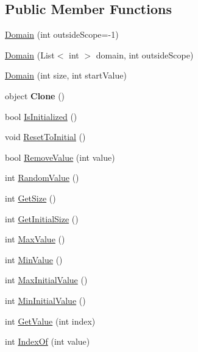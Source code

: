 \subsection*{Public Member Functions}
\begin{DoxyCompactItemize}
\item 
\hyperlink{classghost_1_1Domain_a62af4592a700051d017678189d1f9d2a}{Domain} (int outside\-Scope=-\/1)
\item 
\hyperlink{classghost_1_1Domain_ad73e5c9b5f2044affc5c45fe09f39577}{Domain} (List$<$ int $>$ domain, int outside\-Scope)
\item 
\hyperlink{classghost_1_1Domain_ab3bd027fd023c60ba95ace0108a1c2f7}{Domain} (int size, int start\-Value)
\item 
\hypertarget{classghost_1_1Domain_a4cac9f43b65f302a15cf6cef40eae625}{object {\bfseries Clone} ()}\label{classghost_1_1Domain_a4cac9f43b65f302a15cf6cef40eae625}

\item 
bool \hyperlink{classghost_1_1Domain_a19610b0d083f6a47eeb867fbcf8c0522}{Is\-Initialized} ()
\item 
void \hyperlink{classghost_1_1Domain_a732f5cc39dba50b1abbfc37664a3bbb7}{Reset\-To\-Initial} ()
\item 
bool \hyperlink{classghost_1_1Domain_a40fcb2cb94b09b11e8d8065b36604255}{Remove\-Value} (int value)
\item 
int \hyperlink{classghost_1_1Domain_a953d7b49d7822b351e7c6df7e93c5fbc}{Random\-Value} ()
\item 
int \hyperlink{classghost_1_1Domain_a797a22cd3459acea9b0b02262270c148}{Get\-Size} ()
\item 
int \hyperlink{classghost_1_1Domain_abe541bbc525185aea9eae7b847e65502}{Get\-Initial\-Size} ()
\item 
int \hyperlink{classghost_1_1Domain_a55aa4daa7f62b582d7f845946bc4dcd5}{Max\-Value} ()
\item 
int \hyperlink{classghost_1_1Domain_adaa1c7960de249e4e0e4441e2de5b89b}{Min\-Value} ()
\item 
int \hyperlink{classghost_1_1Domain_a5cdcd82474cf092c917cff1bf4b9d526}{Max\-Initial\-Value} ()
\item 
int \hyperlink{classghost_1_1Domain_a8151d78526668ea28df7b7a4f368cce3}{Min\-Initial\-Value} ()
\item 
int \hyperlink{classghost_1_1Domain_a3fd65cba4849f8de7f40285b73611629}{Get\-Value} (int index)
\item 
int \hyperlink{classghost_1_1Domain_a9fa0bdeca5e9cda748defc7e060ff580}{Index\-Of} (int value)
\end{DoxyCompactItemize}
